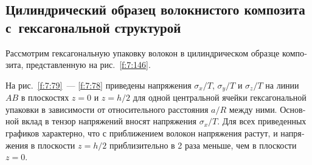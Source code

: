 \begin{russian}


\subsection{Цилиндрический образец волокнистого композита с~гексагональной структурой}

Рассмотрим гексагональную упаковку волокон  в цилиндрическом образце композита, представленную на рис.~\ref{f:7:146}.

На рис.~\ref{f:7:79}~--- \ref{f:7:78} приведены напряжения $\sigma_x/T$, $\sigma_y/T$ и $\sigma_z/T$ на линии $AB$ в плоскостях $z=0$ и $z=h/2$ для одной центральной ячейки гексагональной упаковки в зависимости от относительного расстояния $a/R$ между ними. Основной вклад в тензор напряжений вносят напряжения $\sigma_x/T$. Для всех приведенных графиков характерно, что с приближением волокон напряжения растут, и напряжения в плоскости $z=h/2$ приблизительно в 2 раза меньше, чем в плоскости $z=0$.


\end{russian}
